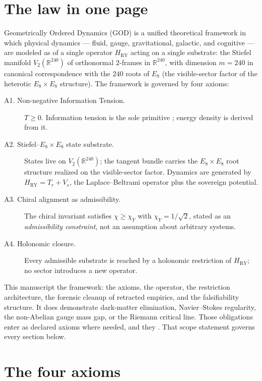 \documentclass{alienfolio}
\begin{document}
\section{The law in one page}
\label{sec:law}

Geometrically Ordered Dynamics (GOD) is a unified theoretical
framework in which physical dynamics --- fluid, gauge, gravitational,
galactic, and cognitive --- are modeled as 
of a single operator $H_{\mathrm{RY}}$ acting on a single substrate: the
Stiefel manifold $V_{2}(\mathbb{R}^{240})$ of orthonormal $2$-frames in
$\mathbb{R}^{240}$, with dimension $m = 240$ in canonical correspondence
with the $240$ roots of $E_{8}$ (the visible-sector factor of the
heterotic $E_{8} \times E_{8}$ structure). The framework is governed by
four axioms:

\begin{description}
\item[A1. Non-negative Information Tension.] $T \ge 0$. Information
tension is the sole primitive \cite{shannon48,cover06}; energy density is
derived from it.
\item[A2. Stiefel--$E_{8} \times E_{8}$ state substrate.] States live on
$V_{2}(\mathbb{R}^{240})$; the tangent bundle carries the $E_{8} \times E_{8}$
root structure realized on the visible-sector factor. Dynamics are
generated by $H_{\mathrm{RY}} = T_{r} + V_{s}$, the Laplace--Beltrami
operator plus the sovereign potential.
\item[A3. Chiral alignment as admissibility.] The chiral invariant
satisfies $\chi \ge \chi_{Y}$ with $\chi_{Y} = 1/\sqrt{2}$, stated as
an \emph{admissibility constraint}, not an assumption about arbitrary
systems.
\item[A4. Holonomic closure.] Every admissible substrate is reached by
a holonomic restriction of $H_{\mathrm{RY}}$; no sector introduces a
new operator.
\end{description}

This manuscript  the framework: the axioms, the
operator, the restriction architecture, the forensic cleanup of
retracted empirics, and the falsifiability structure. It does
 demonstrate dark-matter elimination, Navier--Stokes
regularity, the non-Abelian gauge mass gap, or the Riemann critical
line. Those obligations enter as declared axioms where needed, and they
. That scope statement governs every section below.

\goldrule

\section{The four axioms}
\label{sec:axioms}
\end{document}
